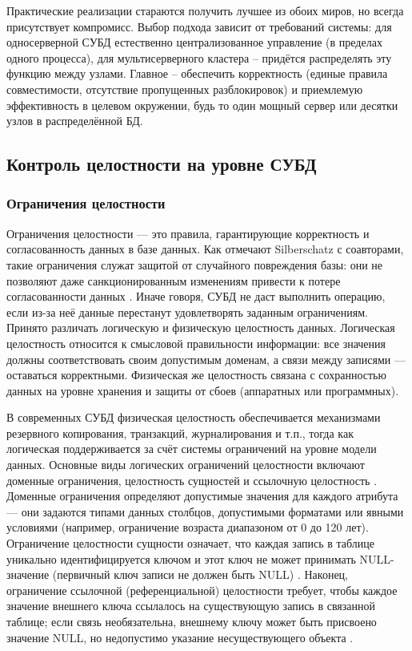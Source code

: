  Практические реализации стараются получить лучшее из обоих миров, но всегда присутствует компромисс. Выбор подхода зависит от требований системы: для односерверной СУБД естественно централизованное управление (в пределах одного процесса), для мультисерверного кластера – придётся распределять эту функцию между узлами. Главное – обеспечить корректность (единые правила совместимости, отсутствие пропущенных разблокировок) и приемлемую эффективность в целевом окружении, будь то один мощный сервер или десятки узлов в распределённой БД.

\subsection{Контроль целостности на уровне СУБД}\label{sec:integrity_dbms_controls}
\subsubsection{Ограничения целостности}

 Ограничения целостности — это правила, гарантирующие корректность и согласованность данных в базе данных. Как отмечают Silberschatz с соавторами, такие ограничения служат защитой от случайного повреждения базы: они не позволяют даже санкционированным изменениям привести к потере согласованности данных \autocite{Silberschatz}. Иначе говоря, СУБД не даст выполнить операцию, если из-за неё данные перестанут удовлетворять заданным ограничениям. Принято различать логическую и физическую целостность данных. Логическая целостность относится к смысловой правильности информации: все значения должны соответствовать своим допустимым доменам, а связи между записями — оставаться корректными. Физическая же целостность связана с сохранностью данных на уровне хранения и защиты от сбоев (аппаратных или программных). 
 
 В современных СУБД физическая целостность обеспечивается механизмами резервного копирования, транзакций, журналирования и т.п., тогда как логическая поддерживается за счёт системы ограничений на уровне модели данных. Основные виды логических ограничений целостности включают доменные ограничения, целостность сущностей и ссылочную целостность \autocite{ElmasriNavathe}. Доменные ограничения определяют допустимые значения для каждого атрибута — они задаются типами данных столбцов, допустимыми форматами или явными условиями (например, ограничение возраста диапазоном от 0 до 120 лет). Ограничение целостности сущности означает, что каждая запись в таблице уникально идентифицируется ключом и этот ключ не может принимать NULL-значение (первичный ключ записи не должен быть NULL) \autocite{ElmasriNavathe}. Наконец, ограничение ссылочной (референциальной) целостности требует, чтобы каждое значение внешнего ключа ссылалось на существующую запись в связанной таблице; если связь необязательна, внешнему ключу может быть присвоено значение NULL, но недопустимо указание несуществующего объекта \autocite{ElmasriNavathe}. 

